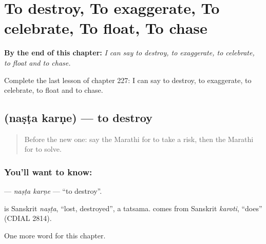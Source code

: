 
\chapter{To destroy, To exaggerate, To celebrate, To float, To chase}
\label{ch:mr-to-destroy-to-exaggerate-to-celebrate-to-float-to-chase}

\begin{chapteropening}
\textbf{By the end of this chapter:} \emph{I can say to destroy, to exaggerate, to celebrate, to float and to chase.}

Complete the last lesson of chapter 227: I can say to destroy, to exaggerate, to celebrate, to float and to chase.
\end{chapteropening}

\section[\texorpdfstring{\mr{नष्ट} \mr{करणे} (naṣṭa karṇe)}{नष्ट करणे (naṣṭa karṇe)}]{  (naṣṭa karṇe) — to destroy}

\label{lesson:MR-C227-nasta-karne}



\begin{quote}
Before the new one: say the Marathi for to take a risk, then the Marathi for to solve.
\end{quote}

\subsection*{You'll want to know:  }
\textbf{ } — \emph{naṣṭa karṇe} — \textquotedblleft{}to destroy\textquotedblright{}.

\begin{cousinweb}
\textbf{} is Sanskrit \emph{naṣṭa}, \textquotedblleft{}lost, destroyed\textquotedblright{}, a tatsama. \textbf{} comes from Sanskrit \emph{karoti}, \textquotedblleft{}does\textquotedblright{} (CDIAL 2814).
\end{cousinweb}

\begin{grammarlens}[title={What you've built}]
One more word for this chapter.
\end{grammarlens}

